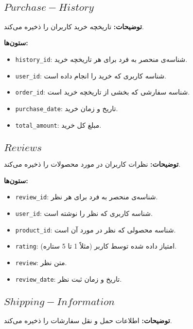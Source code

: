 \documentclass[12pt]{article}
\begin{document}
\subsection{\(Purchase-History\)}

\textbf{توضیحات:} تاریخچه خرید کاربران را ذخیره می‌کند.

\textbf{ستون‌ها:}
\begin{itemize}
    \item \texttt{history\_id}: شناسه‌ی منحصر به فرد برای هر تاریخچه خرید.
    \item \texttt{user\_id}: شناسه کاربری که خرید را انجام داده است.
    \item \texttt{order\_id}: شناسه سفارشی که بخشی از تاریخچه خرید است.
    \item \texttt{purchase\_date}: تاریخ و زمان خرید.
    \item \texttt{total\_amount}: مبلغ کل خرید.
\end{itemize}

\subsection{\(Reviews\)}

\textbf{توضیحات:} نظرات کاربران در مورد محصولات را ذخیره می‌کند.

\textbf{ستون‌ها:}
\begin{itemize}
    \item \texttt{review\_id}: شناسه‌ی منحصر به فرد برای هر نظر.
    \item \texttt{user\_id}: شناسه کاربری که نظر را نوشته است.
    \item \texttt{product\_id}: شناسه محصولی که نظر در مورد آن است.
    \item \texttt{rating}: امتیاز داده شده توسط کاربر (مثلاً 1 تا 5 ستاره).
    \item \texttt{review}: متن نظر.
    \item \texttt{review\_date}: تاریخ و زمان ثبت نظر.
\end{itemize}

\subsection{\(Shipping-Information\)}

\textbf{توضیحات:} اطلاعات حمل و نقل سفارشات را ذخیره می‌کند.
\end{document}
